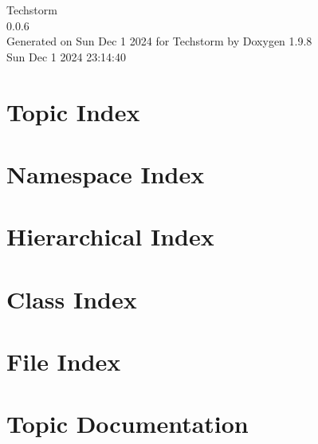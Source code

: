 \documentclass[twoside]{book}
\newcommand{\+}{\discretionary{\mbox{\scriptsize$\hookleftarrow$}}{}{}}
\newcommand{\clearemptydoublepage}{%
    \newpage{\pagestyle{empty}\cleardoublepage}%
  }
\begin{document}
  \raggedbottom
    \hypersetup{pageanchor=false,
                bookmarksnumbered=true,
                pdfencoding=unicode
               }
  \begin{titlepage}
  \vspace*{7cm}
  \begin{center}%
  {\Large Techstorm}\\
  [1ex]\large 0.\+0.\+6 \\
  \vspace*{1cm}
  {\large Generated on Sun Dec 1 2024 for Techstorm by Doxygen 1.9.8}\\
    \vspace*{0.5cm}
    {\small Sun Dec 1 2024 23:14:40}
  \end{center}
  \end{titlepage}
  \clearemptydoublepage
  \tableofcontents
  \clearemptydoublepage
  \hypersetup{pageanchor=true}





\chapter{Topic Index}

\chapter{Namespace Index}

\chapter{Hierarchical Index}

\chapter{Class Index}

\chapter{File Index}

\chapter{Topic Documentation}




\end{document}

